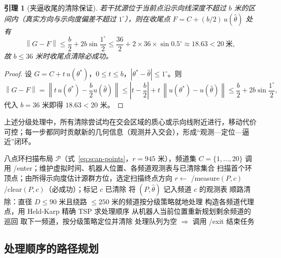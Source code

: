 \documentclass[12pt,a4paper]{ctexart}
\newtheorem{lemma}[theorem]{引理}
\numberwithin{figure}{section}
\numberwithin{table}{section}
\numberwithin{equation}{section}
\newcommand{\norm}[1]{\left\lVert #1\right\rVert}
\begin{document}
\begin{lemma}[夹逼收尾的清除保证]
\label{lem:bracket}
若干扰源位于当前点沿示向线深度不超过 $b$ 米的区间内（真实方向与示向度偏差不超过 $1^{\circ}$），则在收尾点 $F=C+(b/2)\,u(\hat{\theta})$ 处有
\begin{equation}
\norm{G-F}\le\frac{b}{2}+2b\sin\frac{1^{\circ}}{2}\le\frac{36}{2}+2\times36\times\sin0.5^{\circ}\approx18.63<20\ \text{米},
\end{equation}
故 $b\le36$ 米时收尾点清除必成功。
\end{lemma}

\begin{proof}
设 $G=C+t\,u(\theta^{*})$，$0\le t\le b$，$|\theta^{*}-\hat{\theta}|\le1^{\circ}$。则
\begin{equation*}
\norm{G-F}=\norm{t\,u(\theta^{*})-\frac{b}{2}u(\hat{\theta})}\le\left|t-\frac{b}{2}\right|+t\,\norm{u(\theta^{*})-u(\hat{\theta})}\le\frac{b}{2}+2b\sin\frac{1^{\circ}}{2},
\end{equation*}
代入 $b=36$ 米即得 $18.63<20$ 米。
\end{proof}

上述分级处理中，所有清除尝试均在交会区域的质心或示向线附近进行，移动代价可控；每一步都同时贡献新的几何信息（观测并入交会），形成“观测—定位—逼近”闭环。

\begin{algorithm}[H]
\caption{问题三总体流程}
\label{alg:q3}
\begin{algorithmic}[1]
\Require 八点环扫描布局 $\mathcal{P}$（式~\eqref{eq:scan-points}，$r=945$ 米），频道集 $C=\{1,\dots,20\}$
\State 调用 /enter；维护虚拟时间、机器人位置、各频道观测表与已清除集合
\State 扫描首个环顶点；由所得示向度估计源群方位，选定扫描终点方向
        \State $r\leftarrow$ /measure$(P,c)$
         \State /clear$(P,c)$（必成功）；标记 $c$ 已清除  \State 将 $(P,\hat{\theta})$ 记入频道 $c$ 的观测表 \EndIf
    \EndFor
    \State 顺路清除：直径 $D\le90$ 米且绕路 $\le250$ 米的频道按分级策略就地处理
\EndFor
\State 构造各频道代理点，用 Held-Karp 精确 TSP 求处理顺序
    \State 从机器人当前位置重新规划剩余频道的巡回
    \State 取下一频道，按分级策略定位并清除
\EndWhile
\State 处理队列为空 $\Rightarrow$ 调用 /exit 结束任务
\end{algorithmic}
\end{algorithm}

\subsection{处理顺序的路径规划}
\end{document}
